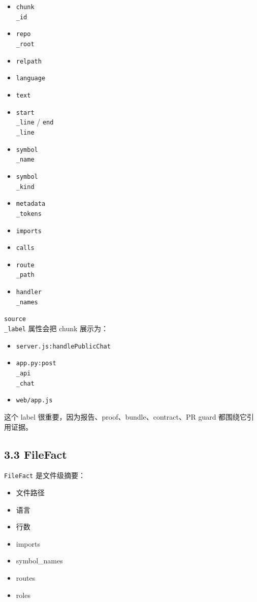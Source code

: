\documentclass[UTF8,12pt,openany]{ctexbook}
\begin{document}
\begin{itemize}
\item \texttt{chunk\\_id}
\item \texttt{repo\\_root}
\item \texttt{relpath}
\item \texttt{language}
\item \texttt{text}
\item \texttt{start\\_line} / \texttt{end\\_line}
\item \texttt{symbol\\_name}
\item \texttt{symbol\\_kind}
\item \texttt{metadata\\_tokens}
\item \texttt{imports}
\item \texttt{calls}
\item \texttt{route\\_path}
\item \texttt{handler\\_names}
\end{itemize}

\texttt{source\\_label} 属性会把 chunk 展示为：\par

\begin{itemize}
\item \texttt{server.js:handlePublicChat}
\item \texttt{app.py:post\\_api\\_chat}
\item \texttt{web/app.js}
\end{itemize}

这个 label 很重要，因为报告、proof、bundle、contract、PR guard 都围绕它引用证据。\par

\subsection{3.3 FileFact}

\texttt{FileFact} 是文件级摘要：\par

\begin{itemize}
\item 文件路径
\item 语言
\item 行数
\item imports
\item symbol\_names
\item routes
\item roles
\end{itemize}
\end{document}
